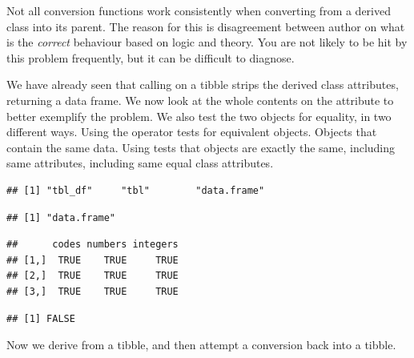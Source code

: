 \documentclass[krantz2]{krantz}\usepackage{knitr}%
\begin{document}
\begin{explainbox}
Not all conversion functions work consistently when converting from a derived class into its parent. The reason for this is disagreement between author on what is the \emph{correct} behaviour based on logic and theory. You are not likely to be hit by this problem frequently, but it can be difficult to diagnose.

We have already seen that calling  on a tibble strips the derived class attributes, returning a data frame. We now look at the whole contents on the  attribute to better exemplify the problem. We also test the two objects for equality, in two different ways. Using the operator \code{==} tests for equivalent objects. Objects that contain the same data. Using  tests that objects are exactly the same, including same attributes, including same equal class attributes.

\begin{knitrout}\footnotesize
{}\color{fgcolor}\begin{kframe}
\begin{alltt}
\end{alltt}
\begin{verbatim}
## [1] "tbl_df"     "tbl"        "data.frame"
\end{verbatim}
\begin{alltt}
\end{alltt}
\begin{verbatim}
## [1] "data.frame"
\end{verbatim}
\begin{alltt}
 \hlopt{==} 
\end{alltt}
\begin{verbatim}
##      codes numbers integers
## [1,]  TRUE    TRUE     TRUE
## [2,]  TRUE    TRUE     TRUE
## [3,]  TRUE    TRUE     TRUE
\end{verbatim}
\begin{alltt}
\end{alltt}
\begin{verbatim}
## [1] FALSE
\end{verbatim}
\end{kframe}
\end{knitrout}

Now we derive from a tibble, and then attempt a conversion back into a tibble.


\end{explainbox}
\end{document}
